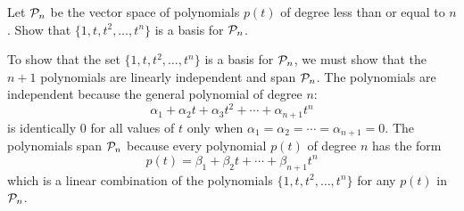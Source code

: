 \documentclass{ximera}
\begin{document}
\begin{exercise}  \label{c7.2.2}
Let ${\cal P}_n$ be the vector space of polynomials $p(t)$ of
degree less than or equal to $n$.  Show that $\{1,t,t^2,\ldots,t^n\}$ is a
basis for ${\cal P}_n$.

\begin{solution}

To show that the set $\{1,t,t^2,\dots,t^n\}$ is a basis for
${\cal P}_n$, we must show that the $n + 1$ polynomials are
linearly independent and span ${\cal P}_n$.  The polynomials are
independent because the general polynomial of degree $n$:
\[
\alpha_1 + \alpha_2t + \alpha_3t^2 + \cdots + \alpha_{n+1}t^n
\]
is identically $0$ for all values of $t$ only when $\alpha_1 =
\alpha_2 = \cdots = \alpha_{n + 1} = 0$.  The polynomials span
${\cal P}_n$ because every polynomial $p(t)$ of degree $n$ has
the form
\[ p(t) = \beta_1 + \beta_2t + \cdots + \beta_{n + 1}t^n \]
which is a linear combination of the polynomials
$\{1,t,t^2,\dots,t^n\}$ for any $p(t)$ in ${\cal P}_n$.

\end{solution}
\end{exercise}
\end{document}

